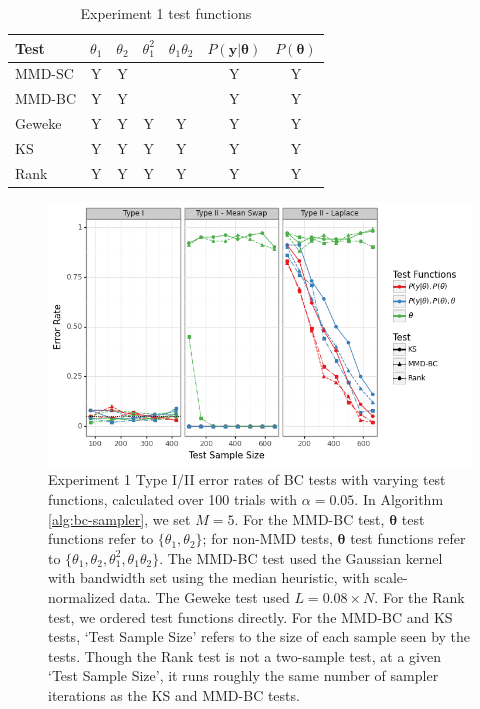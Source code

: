 \documentclass[a4paper,12pt]{article}
\begin{document}
\begin{table}[H]
    \centering
    \begin{tabular}{l|c|c|c|c|c|c}
         Test  & $\theta_{1}$ & $\theta_{2}$ & $\theta_{1}^{2}$ & $\theta_{1}\theta_{2}$ & $P(\mathbf{y}|\mathbf{\theta})$ & $P(\mathbf{\theta})$ \\
         \hline
         MMD-SC & Y & Y & & & Y & Y \\
         MMD-BC & Y & Y & & & Y & Y \\
         Geweke & Y & Y & Y & Y & Y & Y \\
         KS & Y & Y & Y & Y & Y & Y \\
         Rank & Y & Y & Y & Y & Y & Y \\
    \end{tabular}
    \caption{Experiment 1 test functions}
    \label{tab:ex1_testfn}
\end{table}

\begin{figure}
    \centering
    \includegraphics[width=\textwidth]{figures/gandy_scott_aux.png}
    \caption{Experiment 1 Type I/II error rates of BC tests with varying test functions, calculated over 100 trials with $\alpha=0.05$. In Algorithm \ref{alg:bc-sampler}, we set $M=5$. For the MMD-BC test, $\mathbf{\theta}$ test functions refer to $\{\theta_{1}, \theta_{2}\}$; for non-MMD tests, $\mathbf{\theta}$ test functions refer to $\{\theta_{1}, \theta_{2}, \theta_{1}^{2}, \theta_{1}\theta_{2}\}$. The MMD-BC test used the Gaussian kernel with bandwidth set using the median heuristic, with scale-normalized data. The Geweke test used  $L = 0.08 \times N$. For the Rank test, we ordered test functions directly. For the MMD-BC and KS tests, `Test Sample Size' refers to the size of each sample seen by the tests. Though the Rank test is not a two-sample test, at a given `Test Sample Size', it runs roughly the same number of sampler iterations as the KS and MMD-BC tests.}
    \label{fig:ex1_aux}
\end{figure}
\end{document}
